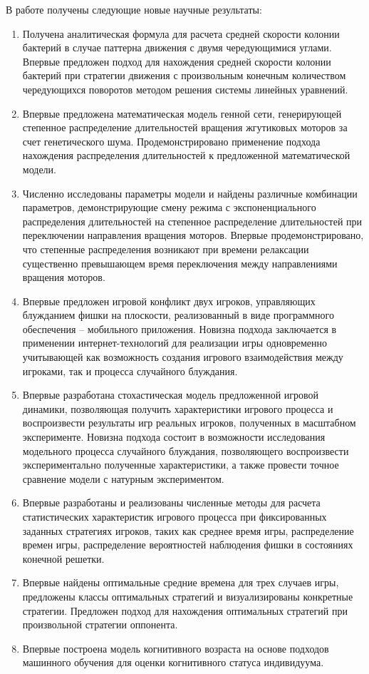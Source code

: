 {\novelty}
В работе получены следующие новые научные результаты:
\begin{enumerate}[beginpenalty=10000] %
  \item Получена аналитическая формула для расчета средней скорости колонии бактерий в случае паттерна движения с двумя чередующимися углами. Впервые предложен подход для нахождения средней скорости колонии бактерий при стратегии движения с произвольным конечным количеством чередующихся поворотов методом решения системы линейных уравнений.
  \item Впервые предложена математическая модель генной сети, генерирующей степенное распределение длительностей вращения жгутиковых моторов за счет генетического шума. Продемонстрировано применение подхода нахождения распределения длительностей к предложенной математической модели.
  \item Численно исследованы параметры модели и найдены различные комбинации параметров, демонстрирующие смену режима с экспоненциального распределения длительностей на степенное распределение длительностей при переключении направления вращения моторов. Впервые продемонстрировано, что степенные распределения возникают при времени релаксации существенно превышающем время переключения между направлениями вращения моторов.
  \item Впервые предложен игровой конфликт двух игроков, управляющих блужданием фишки на плоскости, реализованный в виде программного обеспечения -- мобильного приложения. Новизна подхода заключается в применении интернет-технологий для реализации игры одновременно учитывающей как возможность создания игрового взаимодействия между игроками, так и процесса случайного блуждания.
  \item Впервые разработана стохастическая модель предложенной игровой динамики, позволяющая получить характеристики игрового процесса и воспроизвести результаты игр реальных игроков, полученных в масштабном эксперименте. Новизна подхода состоит в возможности исследования модельного процесса случайного блуждания, позволяющего воспроизвести экспериментально полученные характеристики, а также провести точное сравнение модели с натурным экспериментом.
  \item Впервые разработаны и реализованы численные методы для расчета статистических характеристик игрового процесса при фиксированных заданных стратегиях игроков, таких как среднее время игры, распределение времен игры, распределение вероятностей наблюдения фишки в состояниях конечной решетки. 
  \item Впервые найдены оптимальные средние времена для трех случаев игры, предложены классы оптимальных стратегий и визуализированы конкретные стратегии. Предложен подход для нахождения оптимальных стратегий при произвольной стратегии оппонента.
  \item Впервые построена модель когнитивного возраста на основе подходов машинного обучения для оценки когнитивного статуса индивидуума.
\end{enumerate}

